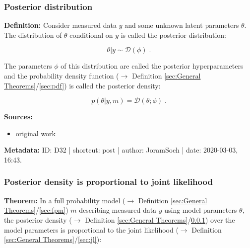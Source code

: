 \documentclass[a4paper,12pt,twoside]{book}
\begin{document}
\subsubsection[\textit{Posterior distribution}]{Posterior distribution} \label{sec:post}
\setcounter{equation}{0}

\textbf{Definition:} Consider measured data $y$ and some unknown latent parameters $\theta$. The distribution of $\theta$ conditional on $y$ is called the posterior distribution:

\begin{equation} \label{eq:post-post}
\theta|y \sim \mathcal{D}(\phi) \; .
\end{equation}

The parameters $\phi$ of this distribution are called the posterior hyperparameters and the probability density function ($\rightarrow$ Definition \ref{sec:General Theorems}/\ref{sec:pdf}) is called the posterior density:

\begin{equation} \label{eq:post-prior-pdf}
p(\theta|y,m) = \mathcal{D}(\theta; \phi) \; .
\end{equation}


\vspace{1em}
\textbf{Sources:}
\begin{itemize}
\item original work\end{itemize}


\vspace{1em}
\textbf{Metadata:} ID: D32 | shortcut: post | author: JoramSoch | date: 2020-03-03, 16:43.
\vspace{1em}



\subsubsection[\textbf{Posterior density is proportional to joint likelihood}]{Posterior density is proportional to joint likelihood} \label{sec:post-jl}
\setcounter{equation}{0}

\textbf{Theorem:} In a full probability model ($\rightarrow$ Definition \ref{sec:General Theorems}/\ref{sec:fpm}) $m$ describing measured data $y$ using model parameters $\theta$, the posterior density ($\rightarrow$ Definition \ref{sec:General Theorems}/\ref{sec:post}) over the model parameters is proportional to the joint likelihood ($\rightarrow$ Definition \ref{sec:General Theorems}/\ref{sec:jl}):
\end{document}
